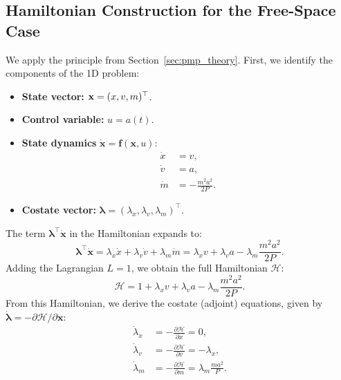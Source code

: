 \documentclass[journal, a4paper]{IEEEtran}
\begin{document}
\subsection{Hamiltonian Construction for the Free-Space Case}
We apply the principle from Section~\ref{sec:pmp_theory}. First, we identify the components of the 1D problem:
\begin{itemize}
    \item \textbf{State vector:} ${\bf x} = (x, v, m)^\top$.
    \item \textbf{Control variable:} $u = a(t)$.
    \item \textbf{State dynamics} $\dot{\mathbf{x}} = \mathbf{f}(\mathbf{x}, u)$:
    \begin{align}
      \dot x &= v, \label{eq:state_x_free}\\
      \dot v &= a, \label{eq:state_v_free}\\
      \dot m &= -\frac{m^{2}a^{2}}{2P}. \label{eq:state_m_free}
    \end{align}
    \item \textbf{Costate vector:} $\boldsymbol{\lambda} = (\lambda_x, \lambda_v, \lambda_m)^\top$.
\end{itemize}
The term $\boldsymbol{\lambda}^\top \dot{\mathbf{x}}$ in the Hamiltonian expands to:
\[
    \boldsymbol{\lambda}^\top \dot{\mathbf{x}} = \lambda_x \dot{x} + \lambda_v \dot{v} + \lambda_m \dot{m} = \lambda_x v + \lambda_v a - \lambda_m \frac{m^2 a^2}{2P}.
\]
Adding the Lagrangian $L=1$, we obtain the full Hamiltonian $\mathcal{H}$:
\begin{equation}
    \mathcal{H} = 1 + \lambda_x v + \lambda_v a - \lambda_m \frac{m^2 a^2}{2P}.
\end{equation}
From this Hamiltonian, we derive the costate (adjoint) equations, given by $\dot{\boldsymbol{\lambda}} = -\partial\mathcal{H}/\partial\mathbf{x}$:
\begin{subequations} \label{eq:costate_free}
\begin{align}
  \dot\lambda_x &= -\frac{\partial\mathcal{H}}{\partial x} = 0, \label{eq:costate_x_free}\\
  \dot\lambda_v &= -\frac{\partial\mathcal{H}}{\partial v} = -\lambda_x, \label{eq:costate_v_free}\\
  \dot\lambda_m &= -\frac{\partial\mathcal{H}}{\partial m} = \lambda_m \frac{m a^2}{P}. \label{eq:costate_m_free}
\end{align}
\end{subequations}
\end{document}
